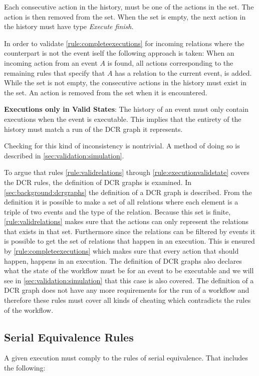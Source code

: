 	Each consecutive action in the history, must be one of the actions in the set. The action is then removed from the set. When the set is empty, the next action in the history must have type \textit{Execute finish}.
	
	\newpar In order to validate \autoref{rule:completeexecutions} for incoming relations where the counterpart is not the event iself the following approach is taken: When an incoming action from an event $A$ is found, all actions corresponding to the remaining rules that specify that $A$ has a relation to the current event, is added. While the set is not empty, the consecutive actions in the history must exist in the set. An action is removed from the set when it is encountered.

	\begin{ruledef}
		\textbf{Executions only in Valid States}: The history of an event must only contain executions when the event is executable. This implies that the entirety of the history must match a run of the DCR graph it represents.
		\label{rule:executionvalidstate}
	\end{ruledef}
	
	\noindent Checking for this kind of inconsistency is nontrivial. A method of doing so is described in \autoref{sec:validation:simulation}.
	
	\newpar To argue that rules \ref{rule:validrelations} through \ref{rule:executionvalidstate} covers the DCR rules, the definition of DCR graphs is examined. In \autoref{sec:background:dcrgraphs} the definition of a DCR graph is described. From the definition it is possible to make a set of all relations where each element is a triple of two events and the type of the relation. Because this set is finite, \autoref{rule:validrelations} makes sure that the actions can only represent the relations that exists in that set. Furthermore since the relations can be filtered by events it is possible to get the set of relations that happen in an execution. This is ensured by \autoref{rule:completeexecutions} which makes sure that every action that should happen, happens in an execution. The definition of DCR graphs also declares what the state of the workflow must be for an event to be executable and we will see in \autoref{sec:validation:simulation} that this case is also covered. The definition of a DCR graph does not have any more requirements for the run of a workflow and therefore these rules must cover all kinds of cheating which contradicts the rules of the workflow.
	
	\subsection{Serial Equivalence Rules}
	A given execution must comply to the rules of serial equivalence. That includes the following:
	
